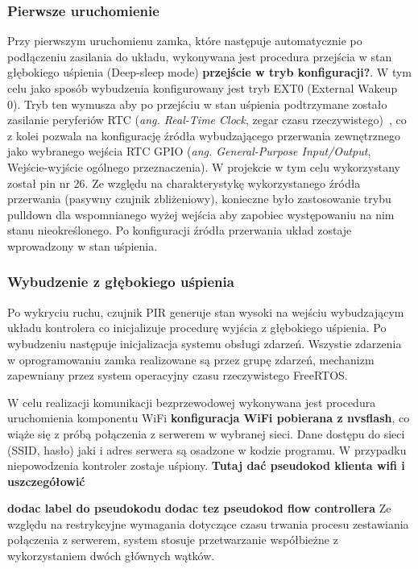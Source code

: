             \subsubsection{Pierwsze uruchomienie}

                Przy pierwszym uruchomienu zamka, które następuje automatycznie po podłączeniu zasilania do układu, wykonywana jest procedura przejścia w stan głębokiego uśpienia (Deep-sleep mode) \textbf{przejście w tryb konfiguracji?}. W tym celu jako sposób wybudzenia konfigurowany jest tryb EXT0 (External Wakeup 0). Tryb ten wymusza aby po przejściu w stan uśpienia podtrzymane zostało zasilanie peryferiów RTC (\textit{ang. Real-Time Clock}, zegar czasu rzeczywistego)~\cite{esp32-api-ref}, co z kolei pozwala na konfigurację źródła wybudzającego przerwania zewnętrznego jako wybranego wejścia RTC GPIO (\textit{ang. General-Purpose Input/Output}, Wejście-wyjście ogólnego przeznaczenia). W projekcie w tym celu wykorzystany został pin nr 26. Ze względu na charakterystykę wykorzystanego źródła przerwania (pasywny czujnik zbliżeniowy), konieczne było zastosowanie trybu pulldown dla wspomnianego wyżej wejścia aby zapobiec występowaniu na nim stanu nieokreślonego. Po konfiguracji źródła przerwania układ zostaje wprowadzony w stan uśpienia.

            \subsubsection{Wybudzenie z głębokiego uśpienia}

                Po wykryciu ruchu, czujnik PIR generuje stan wysoki na wejściu wybudzającym układu kontrolera co inicjalizuje procedurę wyjścia z głębokiego uśpienia. Po wybudzeniu następuje inicjalizacja systemu obsługi zdarzeń. Wszystie zdarzenia w oprogramowaniu zamka realizowane są przez grupę zdarzeń, mechanizm zapewniany przez system operacyjny czasu rzeczywistego FreeRTOS.

                W celu realizacji komunikacji bezprzewodowej wykonywana jest procedura uruchomienia komponentu WiFi \textbf{konfiguracja WiFi pobierana z nvsflash}, co wiąże się z próbą połączenia z serwerem w wybranej sieci. Dane dostępu do sieci (SSID, hasło) jaki i adres serwera są osadzone w kodzie programu. W przypadku niepowodzenia kontroler zostaje uśpiony. \textbf{Tutaj dać pseudokod klienta wifi i uszczegółowić}
                

                \textbf{dodac label do pseudokodu}
                \textbf{dodac tez pseudokod flow controllera}
                Ze względu na restrykcyjne wymagania dotyczące czasu trwania procesu zestawiania połączenia z serwerem, system stosuje przetwarzanie współbieżne z wykorzystaniem dwóch głównych wątków.

